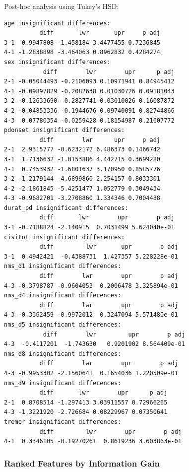 \documentclass[letterpaper,12pt]{article}
\begin{document}
Post-hoc analysis using Tukey's HSD:
\begin{verbatim}
age insignificant differences:
          diff       lwr       upr     p adj
3-1  0.9947808 -1.458184 3.4477455 0.7236845
4-1 -1.2838898 -3.464063 0.8962832 0.4284274
sex insignificant differences:
           diff        lwr        upr      p adj
2-1 -0.05044493 -0.2106093 0.10971941 0.84945412
4-1 -0.09897829 -0.2082638 0.01030726 0.09181043
3-2 -0.12633690 -0.2827741 0.03010026 0.16087872
4-2 -0.04853336 -0.1944676 0.09740091 0.82744866
4-3  0.07780354 -0.0259428 0.18154987 0.21607772
pdonset insignificant differences:
          diff        lwr      upr     p adj
2-1  2.9315777 -0.6232172 6.486373 0.1466742
3-1  1.7136632 -1.0153886 4.442715 0.3699280
4-1  0.7453932 -1.6801637 3.170950 0.8585776
3-2 -1.2179144 -4.6899860 2.254157 0.8033301
4-2 -2.1861845 -5.4251477 1.052779 0.3049434
4-3 -0.9682701 -3.2708860 1.334346 0.7004488
durat_pd insignificant differences:
          diff       lwr        upr        p adj
3-1 -0.7188824 -2.140915  0.7031499 5.624040e-01
cisitot insignificant differences:
          diff         lwr       upr        p adj
3-1  0.4942421  -0.4388731  1.427357 5.228228e-01
nms_d1 insignificant differences:
          diff        lwr        upr        p adj
4-3 -0.3798787 -0.9604053  0.2006478 3.325894e-01
nms_d4 insignificant differences:
          diff        lwr        upr        p adj
4-3 -0.3362459 -0.9972012  0.3247094 5.571480e-01
nms_d5 insignificant differences:
           diff        lwr         upr        p adj
4-3  -0.4117201  -1.743630   0.9201902 8.564409e-01
nms_d8 insignificant differences:
          diff        lwr        upr        p adj
4-3 -0.9953302 -2.1560641  0.1654036 1.220509e-01
nms_d9 insignificant differences:
          diff       lwr        upr      p adj
2-1  0.8708514 -1.297413 3.03911557 0.72966265
4-3 -1.3221920 -2.726684 0.08229967 0.07350641
tremor insignificant differences:
          diff         lwr        upr        p adj
4-1  0.3346105 -0.19270261  0.8619236 3.603863e-01
\end{verbatim}

\subsubsection{Ranked Features by Information Gain}
\end{document}
